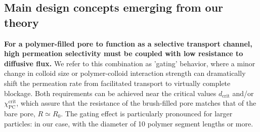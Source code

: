 \documentclass[12pt, a4paper]{article}
\begin{document}




\subsection{Main design concepts emerging from our theory}

\textbf{For a polymer-filled pore to function as a selective transport channel, high permeation selectivity must be coupled with low resistance to diffusive flux.}
We refer to this combination as 'gating' behavior, where a minor change in colloid size or polymer-colloid interaction strength can dramatically shift the permeation rate from facilitated transport to virtually complete blockage.
Both requirements can be achieved near the critical values $d_{\text{crit}}$ and/or $\chi_{\text{PC}}^{\text{crit}}$, which assure that the resistance of the brush-filled pore matches that of the bare pore, $R\simeq R_{0}$.
The gating effect is particularly pronounced for larger particles: in our case, with the diameter of 10 polymer segment lengths or more.
\end{document}
